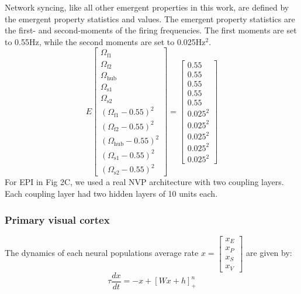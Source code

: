 \documentclass[11pt]{article}
\begin{document}
Network syncing, like all other emergent properties in this work, are defined by the emergent property statistics and values.  The emergent property statistics are the first- and second-moments of the firing frequencies. The first moments are set to 0.55Hz, while the second moments are set to 0.025Hz$^2$.
\begin{equation}
E \begin{bmatrix} \Omega_{\text{f1}} \\ \Omega_{\text{f2}} \\ \Omega_{\text{hub}} \\ \Omega_{\text{s1}} \\ \Omega_{\text{s2}} \\ (\Omega_{\text{f1}} - 0.55)^2 \\ (\Omega_{\text{f2}} - 0.55)^2 \\ (\Omega_{\text{hub}} - 0.55)^2 \\ (\Omega_{\text{s1}} - 0.55)^2 \\ (\Omega_{\text{s2}} - 0.55)^2  \end{bmatrix} = \begin{bmatrix} 0.55 \\ 0.55 \\ 0.55 \\ 0.55 \\ 0.55 \\ 0.025^2 \\ 0.025^2 \\ 0.025^2 \\ 0.025^2 \\ 0.025^2 \end{bmatrix}
\end{equation}
For EPI in Fig 2C, we used a real NVP architecture with two coupling layers.  Each coupling layer had two hidden layers of 10 units each.

\subsubsection{Primary visual cortex} 
The dynamics of each neural populations average rate
$x = \begin{bmatrix} x_E \\ x_P \\ x_S \\ x_V \end{bmatrix}$
are given by:
\begin{equation}
\tau \frac{dx}{dt} = -x + [W x+ h]_+^n
\end{equation}
\end{document}
